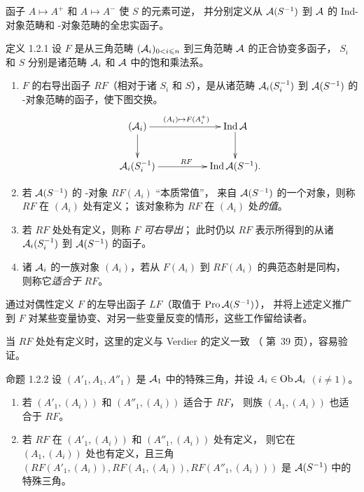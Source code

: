 函子 $A\mapsto A^{+}$ 和 $A\mapsto A^{-}$ 使 $S$ 的元素可逆，
并分别定义从 ${\mathcal A}(S^{-1})$ 到 ${\mathcal A}$ 的 Ind-对象范畴和 \ppro-对象范畴的全忠实函子。

\begin{enonce*}{定义 1.2.1}
设 $F$ 是从三角范畴 $({\mathcal A}_i)_{0<i\leqslant n}$ 到三角范畴 ${\mathcal A}$ 的正合协变多函子，
$S_i$ 和 $S$ 分别是诸范畴 ${\mathcal A}_i$ 和 ${\mathcal A}$ 中的饱和乘法系。
\begin{enumerate}
\renewcommand{\theenumi}{\roman{enumi}}
\renewcommand{\labelenumi}{(\theenumi)}
\item $F$ 的右导出函子 $RF$（相对于诸 $S_i$ 和 $S$），是从诸范畴
${\mathcal A}_i(S^{-1}_i)$ 到 ${\mathcal A}(S^{-1})$ 的 \iInd-对象范畴的函子，使下图交换。
\[
\xymatrix@C=5em{%
  (\Aa_i)  \ar[d]\ar[r]^{(A_i)\sisi{\simarrow}{\mapsto}  F(A^{+}_i)} & \Ind
  \Aa\ar[d] \\
\Aa_i(S^{-1}_i)\ar[r]^{RF} & \Ind\Aa(S^{-1}).
}
\]

\item 若 ${\mathcal A}(S^{-1})$ 的 \iInd-对象 $RF(A_i)$ “本质常值”，
\ie 来自 ${\mathcal A}(S^{-1})$ 的一个对象，则\pageoriginale 称 $RF$ 在 $(A_i)$ 处有定义；
该对象称为 $RF$ 在 $(A_i)$ 处\emph{的值}。

\item 若 $RF$ 处处有定义，则称 $F$ \emph{可右导出}；
此时仍以 $RF$ 表示所得到的从诸 ${\mathcal A}_i(S^{-1}_i)$ 到 ${\mathcal A}(S^{-1})$ 的函子。

\item 诸 ${\mathcal A}_i$ 的一族对象 $(A_i)$，若从 $F(A_i)$ 到 $RF(A_i)$ 的典范态射是同构，
则称它\emph{适合于} $RF$。
\end{enumerate}
\end{enonce*}

通过对偶性定义 $F$ 的左导出函子 $LF$（取值于 $\operatorname{Pro} {\mathcal A}(S^{-1})$），
并将上述定义推广到 $F$ 对某些变量协变、对另一些变量反变的情形，这些工作留给读者。

当 $RF$ 处处有定义时，这里的定义与 Verdier 的定义一致
（\cite{sga4.exp.XVII.bib.CD} 第~39 页），容易验证。

\begin{enonce*}{命题 1.2.2}
设 $(A'_1, A_1,A''_1)$ 是 ${\mathcal A}_1$ 中的特殊三角，并设\break
$A_i\in \operatorname{Ob} {\mathcal A}_i$ $(i\neq 1)$。
\begin{enumerate}
\renewcommand{\theenumi}{\roman{enumi}}
\renewcommand{\labelenumi}{(\theenumi)}
\item 若 $(A'_{1},(A_{i}))$ 和 $(A''_{1},(A_{i}))$ 适合于 $RF$，
  则族 $(A_{1},(A_{i}))$ 也适合于 $RF$。

\item 若 $RF$ 在 $(A'_1, (A_i))$ 和 $(A''_1, (A_i))$ 处有定义，
则它在 $(A_1, (A_i))$ 处也有定义，且三角
$(RF(A'_1,(A_i)), RF(A_1,(A_i)),RF(A''_1,(A_i)))$
是 ${\mathcal A}(S^{-1})$ 中的特殊三角。
\end{enumerate}
\end{enonce*}

